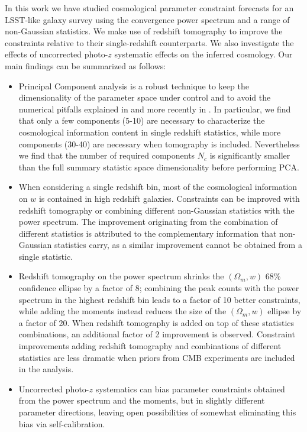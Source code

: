 \documentclass[reprint,aps,prd,superscriptaddress,showkeys,showpacs]{revtex4-1}
\begin{document}
In this work we have studied cosmological parameter constraint forecasts for an LSST-like galaxy survey using the convergence power spectrum and a range of non-Gaussian statistics. We make use of redshift tomography to improve the constraints relative to their single-redshift counterparts. We also investigate the effects of uncorrected photo-$z$ systematic effects on the inferred cosmology. Our main findings can be summarized as follows:
\begin{itemize}
	
	\item Principal Component analysis is a robust technique to keep the dimensionality of the parameter space under control and to avoid the numerical pitfalls explained in \citep{Taylor12,DodelsonSchneider13,Taylor14} and more recently in \citep{PetriVariance}. In particular, we find that only a few components (5-10) are necessary to characterize the cosmological information content in single redshift statistics, while more components (30-40) are necessary when tomography is included. Nevertheless we find that the number of required components $N_c$ is significantly smaller than the full summary statistic space dimensionality before performing PCA.
	
	\item When considering a single redshift bin, most of the cosmological information on $w$ is contained in high redshift galaxies. Constraints can be improved with redshift tomography or combining different non-Gaussian statistics with the power spectrum. The improvement originating from the combination of different statistics is attributed to the complementary information that non-Gaussian statistics carry, as a similar improvement cannot be obtained from a single statistic.    
	
	\item Redshift tomography on the power spectrum shrinks the $(\Omega_m,w)$ 68\% confidence ellipse by a factor of 8; combining the peak counts with the power spectrum in the highest redshift bin leads to a factor of 10 better constraints, while adding the moments instead reduces the size of the $(\Omega_m,w)$ ellipse by a factor of 20. When redshift tomography is added on top of these statistics combinations, an additional factor of 2 improvement is observed. Constraint improvements adding redshift tomography and combinations of different statistics are less dramatic when priors from CMB experiments are included in the analysis. 

	\item Uncorrected photo-$z$ systematics can bias parameter constraints obtained from the power spectrum and the moments, but in slightly different parameter directions, leaving open possibilities of somewhat eliminating this bias via self-calibration. 

\end{itemize}
\end{document}

